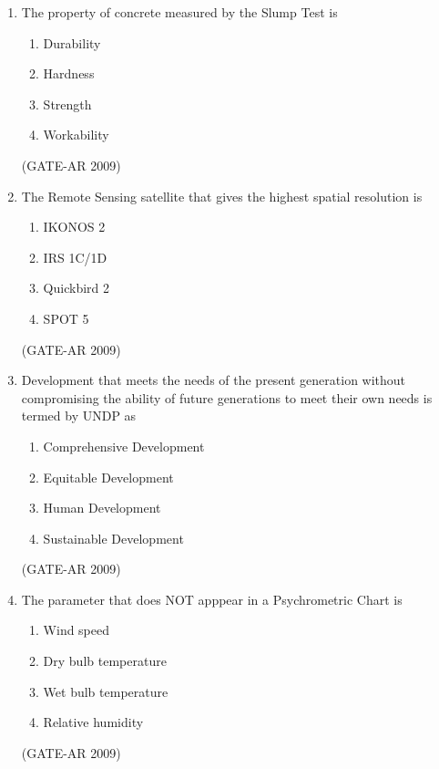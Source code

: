 \documentclass[a4paper,10pt]{article}
\begin{document}
\begin{enumerate}
    \item The property of concrete measured by the Slump Test is 
    \begin{multicols}{4}
	\begin{enumerate}
        \item Durability
        \item Hardness
        \item Strength
        \item Workability
    \end{enumerate}
	\end{multicols}
    \hfill (GATE-AR 2009)
    
    \item The Remote Sensing satellite that gives the highest spatial resolution is 
    \begin{multicols}{4}
	\begin{enumerate}
        \item IKONOS 2
        \item IRS 1C/1D
        \item Quickbird 2
        \item SPOT 5
    \end{enumerate}
	\end{multicols}
    \hfill (GATE-AR 2009)
    
    \item Development that meets the needs of the present generation without compromising the ability of future generations to meet their own needs is termed by UNDP as 
    \begin{multicols}{2}
	\begin{enumerate}
        \item Comprehensive Development
        \item Equitable Development
        \item Human Development
        \item Sustainable Development
    \end{enumerate}
	\end{multicols}
    \hfill (GATE-AR 2009)

	\item The parameter that does NOT apppear in a Psychrometric Chart is 
    \begin{multicols}{2}
	\begin{enumerate}
        \item Wind speed
        \item Dry bulb temperature
        \item Wet bulb temperature
        \item Relative humidity
    \end{enumerate}
	\end{multicols}
    \hfill (GATE-AR 2009)


\end{enumerate}
\end{document}

